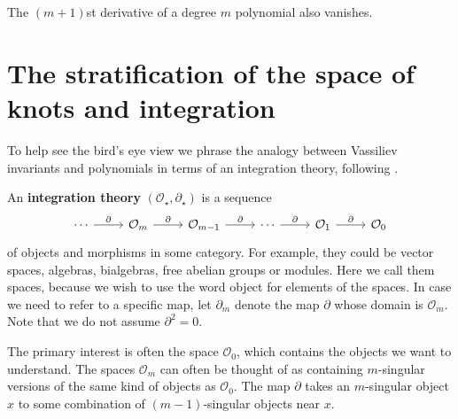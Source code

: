 \begin{remark}
	The \((m + 1)\)st derivative of a degree \(m\) polynomial also vanishes.
\end{remark}

\section{The stratification of the space of knots and integration}
\label{sec:the-stratification-on-the-space-of-knots-and-integration}

To help see the bird's eye view we phrase the analogy between Vassiliev invariants and polynomials in terms of an integration theory, following \cite{integration-of-singular-braid-invariants}.

\begin{definition}
	An \textbf{integration theory} \((\mathcal{O}_{\star}, \partial_{\star})\) is a sequence
	\[\begin{tikzcd}
		\cdots & {\mathcal{O}_{m}} & {\mathcal{O}_{m - 1}} & \cdots & {\mathcal{O}_{1}} & {\mathcal{O}_{0}}
		\arrow["\partial", from=1-1, to=1-2]
		\arrow["\partial", from=1-2, to=1-3]
		\arrow["\partial", from=1-3, to=1-4]
		\arrow["\partial", from=1-4, to=1-5]
		\arrow["\partial", from=1-5, to=1-6]
	\end{tikzcd}\]
	of objects and morphisms in some category. For example, they could be vector spaces, algebras, bialgebras, free abelian groups or modules. Here we call them spaces, because we wish to use the word object for elements of the spaces. In case we need to refer to a specific map, let \(\partial_{m}\) denote the map \(\partial\) whose domain is \(\mathcal{O}_{m}\). Note that we do not assume \(\partial^{2} = 0\).
\end{definition}

The primary interest is often the space \(\mathcal{O}_{0}\), which contains the objects we want to understand. The spaces \(\mathcal{O}_{m}\) can often be thought of as containing \(m\)-singular versions of the same kind of objects as \(\mathcal{O}_{0}\). The map \(\partial\) takes an \(m\)-singular object \(x\) to some combination of \((m - 1)\)-singular objects near \(x\).

